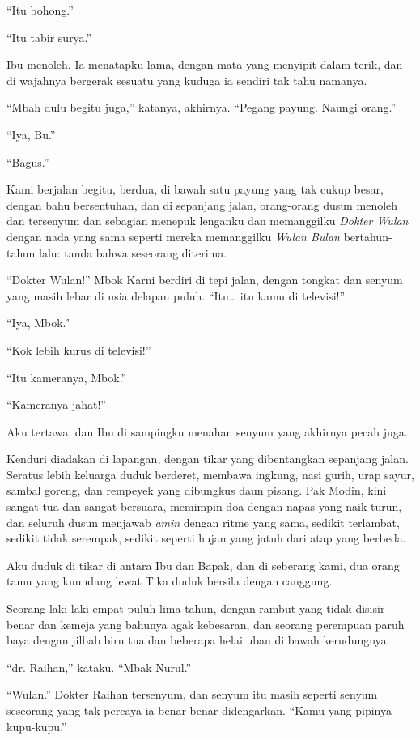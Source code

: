 \documentclass[11pt,twoside,openany]{book}
\makeatletter
\newcommand{\scenebreak}{\par\vspace{0.9em}{\centering\textsc{*\hspace{0.7em}*\hspace{0.7em}*}\par}\vspace{0.9em}\@afterindentfalse\@afterheading}
\makeatother
\begin{document}
``Itu bohong.''

``Itu tabir surya.''

Ibu menoleh. Ia menatapku lama, dengan mata yang menyipit dalam terik, dan di wajahnya bergerak sesuatu yang kuduga ia sendiri tak tahu namanya.

``Mbah dulu begitu juga,'' katanya, akhirnya. ``Pegang payung. Naungi orang.''

``Iya, Bu.''

``Bagus.''

Kami berjalan begitu, berdua, di bawah satu payung yang tak cukup besar, dengan bahu bersentuhan, dan di sepanjang jalan, orang-orang dusun menoleh dan tersenyum dan sebagian menepuk lenganku dan memanggilku \emph{Dokter Wulan} dengan nada yang sama seperti mereka memanggilku \emph{Wulan Bulan} bertahun-tahun lalu: tanda bahwa seseorang diterima.

``Dokter Wulan!'' Mbok Karni berdiri di tepi jalan, dengan tongkat dan senyum yang masih lebar di usia delapan puluh. ``Itu\ldots{} itu kamu di televisi!''

``Iya, Mbok.''

``Kok lebih kurus di televisi!''

``Itu kameranya, Mbok.''

``Kameranya jahat!''

Aku tertawa, dan Ibu di sampingku menahan senyum yang akhirnya pecah juga.

\scenebreak
Kenduri diadakan di lapangan, dengan tikar yang dibentangkan sepanjang jalan. Seratus lebih keluarga duduk berderet, membawa ingkung, nasi gurih, urap sayur, sambal goreng, dan rempeyek yang dibungkus daun pisang. Pak Modin, kini sangat tua dan sangat bersuara, memimpin doa dengan napas yang naik turun, dan seluruh dusun menjawab \emph{amin} dengan ritme yang sama, sedikit terlambat, sedikit tidak serempak, sedikit seperti hujan yang jatuh dari atap yang berbeda.

Aku duduk di tikar di antara Ibu dan Bapak, dan di seberang kami, dua orang tamu yang kuundang lewat Tika duduk bersila dengan canggung.

Seorang laki-laki empat puluh lima tahun, dengan rambut yang tidak disisir benar dan kemeja yang bahunya agak kebesaran, dan seorang perempuan paruh baya dengan jilbab biru tua dan beberapa helai uban di bawah kerudungnya.

``dr. Raihan,'' kataku. ``Mbak Nurul.''

``Wulan.'' Dokter Raihan tersenyum, dan senyum itu masih seperti senyum seseorang yang tak percaya ia benar-benar didengarkan. ``Kamu yang pipinya kupu-kupu.''
\end{document}
